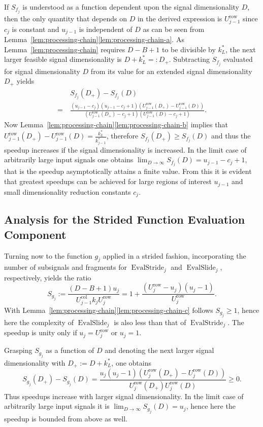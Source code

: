 \documentclass[journal]{IEEEtran}
\DeclareMathOperator{\EvalStride}{EvalStride}
\DeclareMathOperator{\EvalSlide}{EvalSlide}
\newcommand{\row}{\operatorname{row}}
\newcommand{\col}{\operatorname{col}}
\begin{document}
If $S_{f_j}$ is understood as a function dependent upon the signal dimensionality $D$, then the only quantity that depends on $D$ in the derived expression is $U_{j - 1}^{\row}$ since $c_j$ is constant and $u_{j - 1}$ is independent of $D$ as can be seen from Lemma~\ref{lem:processing-chain}\ref{lem:processing-chain-a}.
As Lemma~\ref{lem:processing-chain} requires $D - B + 1$ to be divisible by $k_L^*$, the next larger feasible signal dimensionality is $D + k_L^* =: D_+$.
Subtracting $S_{f_j}$ evaluated for signal dimensionality $D$ from its value for an extended signal dimensionality $D_+$ yields
\begin{align*}
     &S_{f_j}(D_+) - S_{f_j}(D)\\[.5ex]
  =\ &\frac{(u_{j - 1} - c_j) (u_{j - 1} - c_j + 1) (U_{j - 1}^{\row}(D_+) - U_{j - 1}^{\row}(D))}{(U_{j - 1}^{\row}(D_+) - c_j + 1) (U_{j - 1}^{\row}(D) - c_j + 1)}\text{.}
\end{align*}
Now Lemma~\ref{lem:processing-chain}\ref{lem:processing-chain-b} implies that $U_{j - 1}^{\row}(D_+) - U_{j - 1}^{\row}(D) = \frac{k_L^*}{k_{j - 1}^*}$, therefore $S_{f_j}(D_+) \geq S_{f_j}(D)$ and thus the speedup increases if the signal dimensionality is increased.
In the limit case of arbitrarily large input signals one obtains $\lim_{D\to\infty} S_{f_j}(D) = u_{j - 1} - c_j + 1$, that is the speedup asymptotically attains a finite value.
From this it is evident that greatest speedups can be achieved for large regions of interest $u_{j - 1}$ and small dimensionality reduction constants $c_j$.

\subsection{Analysis for the Strided Function Evaluation Component}
Turning now to the function $g_j$ applied in a strided fashion, incorporating the number of subsignals and fragments for $\EvalStride_j$ and $\EvalSlide_j$, respectively, yields the ratio
\begin{displaymath}
  S_{g_j} := \frac{(D - B + 1) u_j}{U_{j - 1}^{\col}k_j U_j^{\row}} = 1 + \frac{(U_j^{\row} - u_j) (u_j - 1)}{U_j^{\row}}\text{.}
\end{displaymath}
With Lemma~\ref{lem:processing-chain}\ref{lem:processing-chain-c} follows $S_{g_j} \geq 1$, hence here the complexity of $\EvalSlide_j$ is also less than that of $\EvalStride_j$.
The speedup is unity only if $u_j = U_j^{\row}$ or $u_j = 1$.

Grasping $S_{g_j}$ as a function of $D$ and denoting the next larger signal dimensionality with $D_+ := D + k_L^*$, one obtains
\begin{displaymath}
  S_{g_j}(D_+) - S_{g_j}(D) = \frac{u_j (u_j \! - \! 1) (U_j^{\row}(D_+) \! - \! U_j^{\row}(D))}{U_j^{\row}(D_+) U_j^{\row}(D)} \geq 0\text{.}
\end{displaymath}
Thus speedups increase with larger signal dimensionality.
In the limit case of arbitrarily large input signals it is $\lim_{D\to\infty} S_{g_j}(D) = u_j$, hence here the speedup is bounded from above as well.
\end{document}
